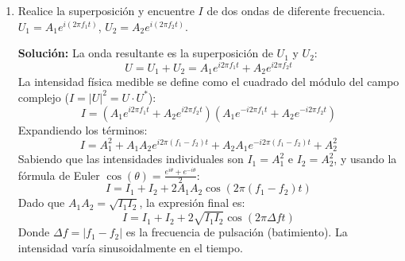 \documentclass[12pt, letterpaper]{article}
\begin{document}
\begin{enumerate}
		\textbf{Solución:}
		El método de desplazamiento de fase (Phase Stepping) busca cuantificar el ángulo de fase $\phi(x,y)$ mediante la adquisición de múltiples interferogramas secuenciales, en los que se introduce deliberadamente un cambio de fase conocido $\alpha_i$ en el brazo de referencia del interferómetro (por ejemplo, moviendo un espejo con un piezoeléctrico).
		
		La ecuación de intensidad para el $i$-ésimo paso es:
		$$ I_i(x,y) = I_0(x,y) + I_M(x,y) \cos[\phi(x,y) + \alpha_i] $$
		Al tener 3 incógnitas fundamentales ($I_0$ luz de fondo, $I_M$ modulación de amplitud y $\phi$ la fase), se necesitan al menos 3 pasos. Si, por ejemplo, utilizamos un algoritmo de 4 pasos con incrementos $\alpha = 0, \pi/2, \pi, 3\pi/2$, obtenemos 4 ecuaciones de intensidad $I_1, I_2, I_3, I_4$.
		
		Combinándolas matemáticamente para aislar $\phi(x,y)$, llegamos a la función arcotangente:
		$$ \phi(x,y) = \arctan\left( \frac{I_4 - I_2}{I_1 - I_3} \right) $$
		Esta ecuación nos proporciona la fase "envuelta" (wrapped) en el dominio $[-\pi, \pi]$, requiriendo posteriormente algoritmos de desenvolvimiento (unwrapping) para obtener la fase física continua.
		
		\item Realice la superposición y encuentre $I$ de dos ondas de diferente frecuencia. $U_{1}=A_{1}e^{i(2\pi f_{1}t)}$, $U_{2}=A_{2}e^{i(2\pi f_{2}t)}$. 
		
		\textbf{Solución:}
		La onda resultante es la superposición de $U_1$ y $U_2$:
		$$ U = U_1 + U_2 = A_1 e^{i 2\pi f_1 t} + A_2 e^{i 2\pi f_2 t} $$
		La intensidad física medible se define como el cuadrado del módulo del campo complejo ($I = |U|^2 = U \cdot U^*$):
		$$ I = (A_1 e^{i 2\pi f_1 t} + A_2 e^{i 2\pi f_2 t}) (A_1 e^{-i 2\pi f_1 t} + A_2 e^{-i 2\pi f_2 t}) $$
		Expandiendo los términos:
		$$ I = A_1^2 + A_1 A_2 e^{i 2\pi (f_1 - f_2) t} + A_2 A_1 e^{-i 2\pi (f_1 - f_2) t} + A_2^2 $$
		Sabiendo que las intensidades individuales son $I_1 = A_1^2$ e $I_2 = A_2^2$, y usando la fórmula de Euler $\cos(\theta) = \frac{e^{i\theta} + e^{-i\theta}}{2}$:
		$$ I = I_1 + I_2 + 2 A_1 A_2 \cos(2\pi (f_1 - f_2) t) $$
		Dado que $A_1 A_2 = \sqrt{I_1 I_2}$, la expresión final es:
		$$ I = I_1 + I_2 + 2\sqrt{I_1 I_2} \cos(2\pi \Delta f t) $$
		Donde $\Delta f = |f_1 - f_2|$ es la frecuencia de pulsación (batimiento). La intensidad varía sinusoidalmente en el tiempo.
		
	\end{enumerate}
	
\end{document}
